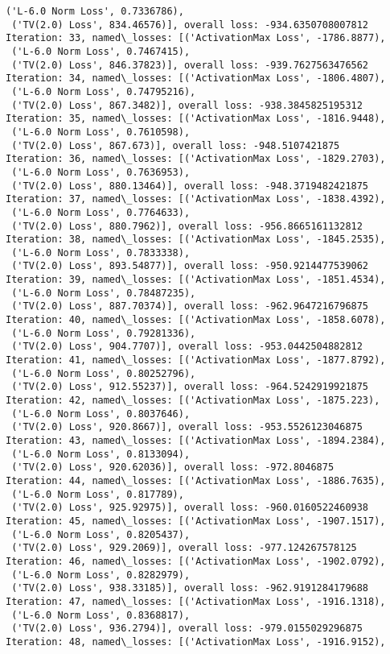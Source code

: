 \documentclass[10pt]{article}
\begin{document}
\begin{Verbatim}[commandchars=\\\{\}]
 ('L-6.0 Norm Loss', 0.7336786),
 ('TV(2.0) Loss', 834.46576)], overall loss: -934.6350708007812
Iteration: 33, named\_losses: [('ActivationMax Loss', -1786.8877),
 ('L-6.0 Norm Loss', 0.7467415),
 ('TV(2.0) Loss', 846.37823)], overall loss: -939.7627563476562
Iteration: 34, named\_losses: [('ActivationMax Loss', -1806.4807),
 ('L-6.0 Norm Loss', 0.74795216),
 ('TV(2.0) Loss', 867.3482)], overall loss: -938.3845825195312
Iteration: 35, named\_losses: [('ActivationMax Loss', -1816.9448),
 ('L-6.0 Norm Loss', 0.7610598),
 ('TV(2.0) Loss', 867.673)], overall loss: -948.5107421875
Iteration: 36, named\_losses: [('ActivationMax Loss', -1829.2703),
 ('L-6.0 Norm Loss', 0.7636953),
 ('TV(2.0) Loss', 880.13464)], overall loss: -948.3719482421875
Iteration: 37, named\_losses: [('ActivationMax Loss', -1838.4392),
 ('L-6.0 Norm Loss', 0.7764633),
 ('TV(2.0) Loss', 880.7962)], overall loss: -956.8665161132812
Iteration: 38, named\_losses: [('ActivationMax Loss', -1845.2535),
 ('L-6.0 Norm Loss', 0.7833338),
 ('TV(2.0) Loss', 893.54877)], overall loss: -950.9214477539062
Iteration: 39, named\_losses: [('ActivationMax Loss', -1851.4534),
 ('L-6.0 Norm Loss', 0.78487235),
 ('TV(2.0) Loss', 887.70374)], overall loss: -962.9647216796875
Iteration: 40, named\_losses: [('ActivationMax Loss', -1858.6078),
 ('L-6.0 Norm Loss', 0.79281336),
 ('TV(2.0) Loss', 904.7707)], overall loss: -953.0442504882812
Iteration: 41, named\_losses: [('ActivationMax Loss', -1877.8792),
 ('L-6.0 Norm Loss', 0.80252796),
 ('TV(2.0) Loss', 912.55237)], overall loss: -964.5242919921875
Iteration: 42, named\_losses: [('ActivationMax Loss', -1875.223),
 ('L-6.0 Norm Loss', 0.8037646),
 ('TV(2.0) Loss', 920.8667)], overall loss: -953.5526123046875
Iteration: 43, named\_losses: [('ActivationMax Loss', -1894.2384),
 ('L-6.0 Norm Loss', 0.8133094),
 ('TV(2.0) Loss', 920.62036)], overall loss: -972.8046875
Iteration: 44, named\_losses: [('ActivationMax Loss', -1886.7635),
 ('L-6.0 Norm Loss', 0.817789),
 ('TV(2.0) Loss', 925.92975)], overall loss: -960.0160522460938
Iteration: 45, named\_losses: [('ActivationMax Loss', -1907.1517),
 ('L-6.0 Norm Loss', 0.8205437),
 ('TV(2.0) Loss', 929.2069)], overall loss: -977.124267578125
Iteration: 46, named\_losses: [('ActivationMax Loss', -1902.0792),
 ('L-6.0 Norm Loss', 0.8282979),
 ('TV(2.0) Loss', 938.33185)], overall loss: -962.9191284179688
Iteration: 47, named\_losses: [('ActivationMax Loss', -1916.1318),
 ('L-6.0 Norm Loss', 0.8368817),
 ('TV(2.0) Loss', 936.2794)], overall loss: -979.0155029296875
Iteration: 48, named\_losses: [('ActivationMax Loss', -1916.9152),

\end{Verbatim}
\end{document}
